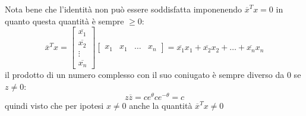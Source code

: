 \documentclass[12pt,a4paper,oneside]{article}
\begin{document}
Nota bene che l'identità non può essere soddisfatta imponenendo $ \overline{x}^{T}x =0$ in quanto questa quantità è sempre $ \ge 0 $:
\[
	\overline{x}^{T}x =
	\begin{bmatrix}
		\overline{x_1} \\
		\overline{x_2} \\
		\vdots         \\
		\overline{x_n}
	\end{bmatrix}
	\begin{bmatrix}
		x_1 & x_1 & \ldots & x_n
	\end{bmatrix}
	=
	\overline{x_1}x_1 + \overline{x_2}x_2 + \ldots + \overline{x_n}x_n
\]
il prodotto di un numero complesso con il suo coniugato è sempre diverso da 0 se $ z \neq 0 $:
\[
	z \overline{z} = c e^{\theta } c e^{-\theta } = c
\]
quindi visto che per ipotesi $ x \neq 0 $ anche la quantità $ \overline{x}^{T}x \neq 0$
\end{document}
